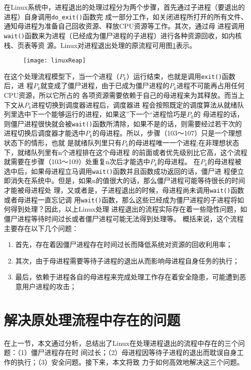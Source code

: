 \documentclass{swfuthesism}
\begin{document}
在Linux系统中，进程退出的处理过程分为两个步骤，首先通过子进程（要退出的进程）自身调用\texttt{do\_exit()}函数完
成一部分工作，如关闭进程所打开的所有文件、通知母进程为准备自己回收资源、释放CPU资源等工作。其次，通过母
进程调用\texttt{wait()}函数来为进程（已经成为僵尸进程的子进程）进行各种资源回收，如内核栈、页表等资
源。Linux对进程退出处理的原流程可用图\ref{fig:workflow-current}表示。

\begin{figure}
  \centering
  \texttt{[image: linuxReap]}
  \label{fig:workflow-current}
\end{figure}

在这个处理流程模型下，当一个进程（$P_k$）运行结束，也就是调用\texttt{exit()}函数后，进
程$P_k$就变成了僵尸进程，由于已成为僵尸进程的$P_k$进程不可能再占用任何CPU资源，所以它所占的
各项资源需要依赖于自己的母进程来为其释放。而当上下文从$P_k$进程切换到调度器进程后，调度器进
程会按照既定的调度算法从就绪队列里选中下一个能够运行的进程，如果这”下一个“进程恰巧是$P_k$的
母进程的话，则僵尸进程很快就会被\texttt{wait()}函数所清除，如果不是的话，则需要经过若干次的
进程切换后调度器才能选中$P_k$的母进程。所以，步骤（103～107）只是一个理想状态下的情形，也就
是就绪队列里只有$P_k$的母进程唯一一个进程;在非理想状态下，就绪队列里有n个进程排在这个母进程
的前面或者优先级别比它高，这个流程就需要在步骤（103～109）处重复n次后才能选中$P_k$的母进程。
在$P_k$的母进程被选中后，如果母进程立马调用\texttt{wait()}函数并且函数成功返回的话，僵尸进
程便立即消失在系统中。但是，如果n的值很大的话，那么僵尸进程可能等待很长的时间才能被母进程处
理，又或者是，子进程退出的时候，母进程尚未调用\texttt{wait()}函数或者母进程一直忘记调
用\texttt{wait()}函数，那么这些已经成为僵尸进程的子进程将如何得到处理？因此，以上Linux处理
进程退出的流程实际存在着一些隐性问题，如僵尸进程等待时间过长或者僵尸进程可能无法得到处理等。
概括来说，这个流程主要存在以下几个问题：

\begin{enumerate}
\item 首先，存在着因僵尸进程存在时间过长而降低系统对资源的回收利用率；
\item 其次，由于母进程需要等待子进程的退出从而影响母进程自身任务的执行；
\item 最后，依赖于进程各自的母进程来完成处理工作存在着安全隐患，可能遭到恶意用户进程的攻击；
\end{enumerate}

\section{解决原处理流程中存在的问题}
\label{sec:solution}
在上一节，本文通过分析，总结出了Linux在处理进程退出的流程中存在的三个问题：（1）僵尸进程存在时
间过长；（2）母进程因等待子进程的退出而耽误自身工作的执行；（3）安全问题。接下来，本文将致
力于如何高效地解决这三个问题。
\end{document}
